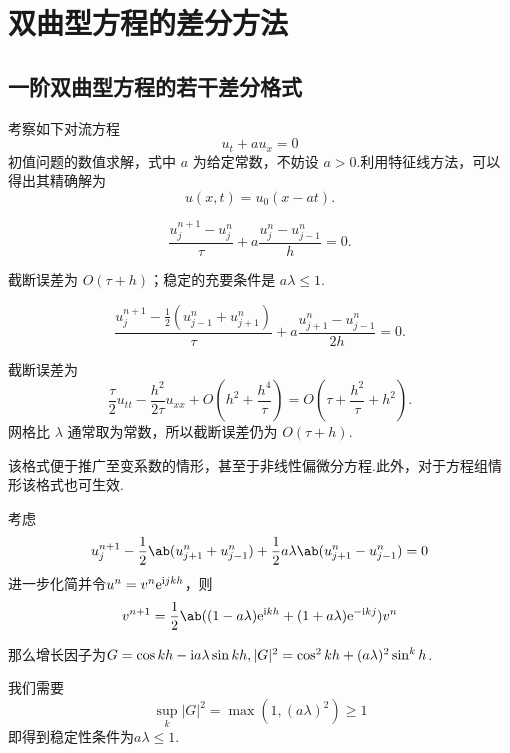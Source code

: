 \chapter{双曲型方程的差分方法}

\section{一阶双曲型方程的若干差分格式}

考察如下对流方程
\begin{equation}\label{eq:convection-3.1}
    u_t + a u_x = 0
\end{equation}
初值问题的数值求解，式中 $a$ 为给定常数，不妨设 $a > 0$.利用特征线方法，可以得出其精确解为
\begin{equation*}
    u(x,t) = u_0(x - at).
\end{equation*}

\noindent{}
\begin{equation}\label{eq:upwind-c3}
    \frac{u_j^{n+1} - u_j^n}{\tau} + a \frac{u_j^n - u_{j-1}^n}{h} = 0.
\end{equation}

截断误差为 $O(\tau + h)$；稳定的充要条件是 $a\lambda \leq 1$.

\noindent{}
\begin{equation}\label{eq:lax-friedrichs-c3}
    \frac{u_j^{n+1} - \tfrac{1}{2}(u_{j-1}^n + u_{j+1}^n)}{\tau} + a \frac{u_{j+1}^n - u_{j-1}^n}{2 h} = 0.
\end{equation}

截断误差为
\begin{equation*}
    \frac{\tau}{2}u_{tt} - \frac{h^2}{2\tau}u_{xx} + O(h^2 + \frac{h^4}{\tau}) = O(\tau + \frac{h^2}{\tau} + h^2).
\end{equation*}
网格比 $\lambda$ 通常取为常数，所以截断误差仍为 $O(\tau + h)$.\par
该格式便于推广至变系数的情形，甚至于非线性偏微分方程.此外，对于方程组情形该格式也可生效.\par
考虑
\begin{equation*}
    u_j^{n+1}-\frac{1}{2}\ab(u_{j+1}^n+u_{j-1}^n)+\frac{1}{2}a\lambda\ab(u_{j+1}^n-u_{j-1}^n)=0
\end{equation*}
进一步化简并令$u^{n}=v^n\mathrm{e}^{\mathrm{i} jkh}$，则
\begin{equation*}
    v^{n+1}=\frac{1}{2}\ab((1-a\lambda)\eu^{\iu kh}+(1+a\lambda)\eu^{-\iu kj})v^n
\end{equation*}

那么增长因子为$G=\cos kh-\mathrm{i} a\lambda\sin kh,|G|^2=\cos^2 kh+(a\lambda)^2\sin^ kh$.\par
我们需要
\begin{equation*}
    \sup_k |G|^2=\max(1,(a\lambda)^2)\geq 1
\end{equation*}
即得到稳定性条件为$a\lambda\leq 1$.


